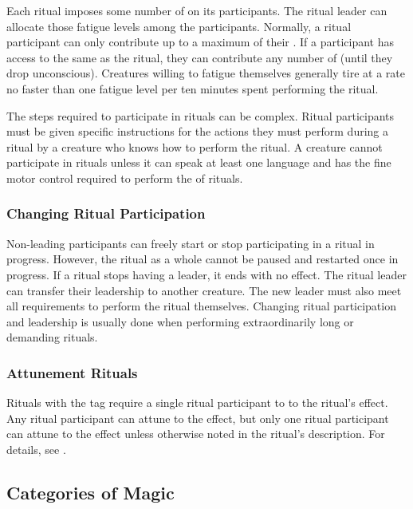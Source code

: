       Each ritual imposes some number of  on its participants.
      The ritual leader can allocate those fatigue levels among the participants.
      Normally, a ritual participant can only contribute  up to a maximum of their .
      If a participant has access to the same  as the ritual, they can contribute any number of  (until they drop unconscious).
      Creatures willing to fatigue themselves generally tire at a rate no faster than one fatigue level per ten minutes spent performing the ritual.

      The steps required to participate in rituals can be complex.
      Ritual participants must be given specific instructions for the actions they must perform during a ritual by a creature who knows how to perform the ritual.
      A creature cannot participate in rituals unless it can speak at least one language and has the fine motor control required to perform the  of rituals.

    \subsubsection{Changing Ritual Participation}
      Non-leading participants can freely start or stop participating in a ritual in progress.
      However, the ritual as a whole cannot be paused and restarted once in progress.
      If a ritual stops having a leader, it ends with no effect.
      The ritual leader can transfer their leadership to another creature.
      The new leader must also meet all requirements to perform the ritual themselves.
      Changing ritual participation and leadership is usually done when performing extraordinarily long or demanding rituals.

    \subsubsection{Attunement Rituals}
      Rituals with the  tag require a single ritual participant to  to the ritual's effect.
      Any ritual participant can attune to the effect, but only one ritual participant can attune to the effect unless otherwise noted in the ritual's description.
      For details, see .

  \subsection{Categories of Magic}

